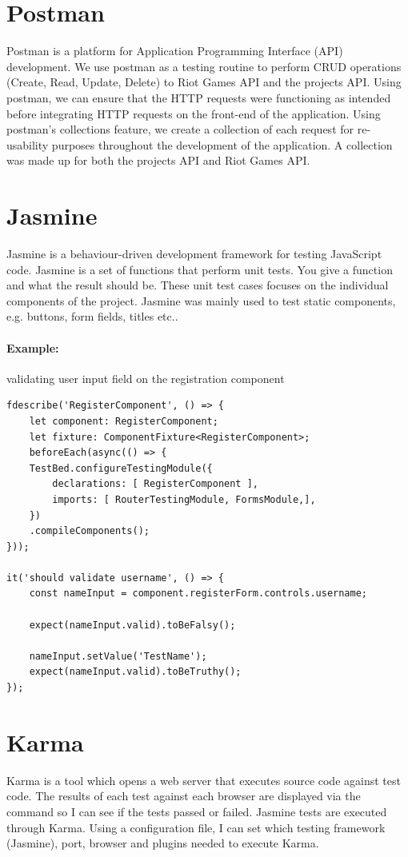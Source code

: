 \section{Postman}
Postman \cite{postman} is a platform for Application Programming Interface (API) development. We use postman as a testing routine to perform CRUD operations (Create, Read, Update, Delete) to Riot Games API and the projects API. Using postman, we can ensure that the HTTP requests were functioning as intended before integrating HTTP requests on the front-end of the application. Using postman's collections feature, we create a collection of each request for re-usability purposes throughout the development of the application. A collection was made up for both the projects API and Riot Games API.
\section{Jasmine}
Jasmine \cite{jasmine} is a behaviour-driven development framework for testing JavaScript code. Jasmine is a set of functions that perform unit tests. You give a function and what the result should be. These unit test cases \cite{elbaum2006carving} focuses on the individual components of the project. Jasmine was mainly used to test static components, e.g. buttons, form fields, titles etc..
\paragraph{Example:} validating user input field on the registration component
\begin{verbatim}
fdescribe('RegisterComponent', () => {
	let component: RegisterComponent;
	let fixture: ComponentFixture<RegisterComponent>;	
	beforeEach(async(() => {
	TestBed.configureTestingModule({
		declarations: [ RegisterComponent ],
		imports: [ RouterTestingModule, FormsModule,],
	})
	.compileComponents();
}));

it('should validate username', () => {
	const nameInput = component.registerForm.controls.username;
	
	expect(nameInput.valid).toBeFalsy();
	
	nameInput.setValue('TestName');
	expect(nameInput.valid).toBeTruthy();
});

\end{verbatim}
 
\section{Karma}
Karma \cite{karmatesting} is a tool which opens a web server that executes source code against test code. The results of each test against each browser are displayed via the command so I can see if the tests passed or failed. Jasmine tests are executed through Karma. Using a configuration file, I can set which testing framework (Jasmine), port, browser and plugins needed to execute Karma.
